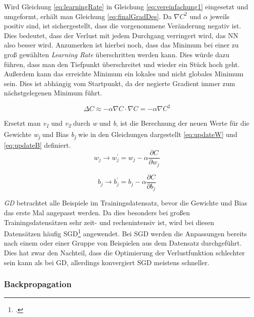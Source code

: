 Wird Gleichung \ref{eq:learningRate} in Gleichung \ref{eq:vereinfachung1} eingesetzt und umgeformt, erhält man Gleichung \ref{eq:finalGradDes}. Da  $\nabla C^2$ und $\alpha$ jeweils positiv sind, ist sichergestellt, dass die vorgenommene Veränderung negativ ist. Dies bedeutet, dass der Verlust mit jedem Durchgang verringert wird, das \ac{NN} also besser wird. Anzumerken ist hierbei noch, dass das Minimum bei einer zu groß gewählten \textit{Learning Rate} überschritten werden kann. Dies würde dazu führen, dass man den Tiefpunkt überschreitet und wieder ein Stück hoch geht. Außerdem kann das erreichte Minimum ein lokales und nicht globales Minimum sein. Dies ist abhängig vom Startpunkt, da der negierte Gradient immer zum nächstgelegenen Minimum führt.

\begin{equation} \label{eq:finalGradDes}
    \Delta C \approx -\alpha \nabla C \cdot  \nabla C =  -\alpha \nabla C^2
\end{equation}

Ersetzt man \textit{v\textsubscript{1}} und \textit{v\textsubscript{2}} durch \textit{w} und \textit{b}, ist die Berechnung der neuen Werte für die Gewichte \textit{w\textsubscript{j}} und Bias \textit{b\textsubscript{j}} wie in den Gleichungen dargestellt \ref{eq:updateW} und \ref{eq:updateB} definiert.
\begin{equation} \label{eq:updateW}
    w_{j} \rightarrow w_{j}^{'} = w_{j} - \alpha \frac{\partial C}{\partial w_{j}}
\end{equation}

\begin{equation} \label{eq:updateB}
    b_{j} \rightarrow b_{j}^{'} = b_{j} - \alpha \frac{\partial C}{\partial b_{j}}
\end{equation}

\textit{\ac{GD}} betrachtet alle Beispiele im Trainingsdatensatz, bevor die Gewichte und Bias das erste Mal angepasst werden. Da dies  besonders bei großen Trainingsdatensätzen sehr zeit- und rechenintensiv ist, wird bei diesen Datensätzen häufig \ac{SGD}\footcite[Vgl. ][S. 400 ff.]{robbinsStochasticApproximationMethod1951}  angewendet. Bei \ac{SGD} werden die Anpassungen bereits nach einem oder einer Gruppe von Beispielen aus dem Datensatz durchgeführt. Dies hat zwar den Nachteil, dass die Optimierung der Verlustfunktion schlechter sein kann als bei \ac{GD}, allerdings konvergiert \ac{SGD} meistens schneller.

\subsubsection{Backpropagation}

